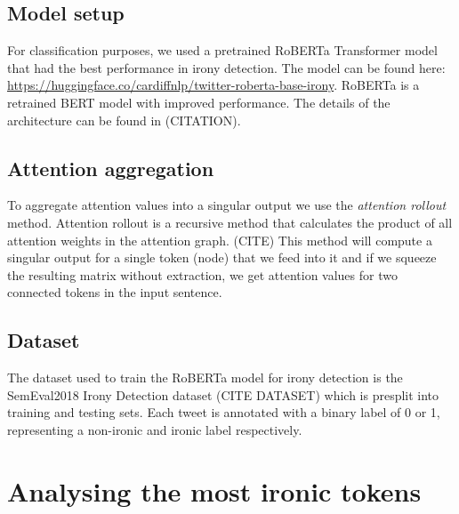 \documentclass[10pt, a4paper]{article}
\begin{document}
\subsection{Model setup}
\label{sec:first}

For classification purposes, we used a pretrained RoBERTa Transformer model that had the best performance in irony detection.
The model can be found here: \url{https://huggingface.co/cardiffnlp/twitter-roberta-base-irony}.
RoBERTa is a retrained BERT model with improved performance. The details of the architecture can be found in (CITATION). 

\subsection{Attention aggregation}
\label{sec:attaggr}

To aggregate attention values into a singular output we use the \textit{attention rollout} method.
Attention rollout is a recursive method that calculates the product of all attention weights in the attention graph. (CITE)
This method will compute a singular output for a single token (node) that we feed into it and if we squeeze the resulting matrix without extraction, we get attention values for two connected tokens in the input sentence.

\subsection{Dataset}

The dataset used to train the RoBERTa model for irony detection is the SemEval2018 Irony Detection dataset (CITE DATASET) which is presplit into training and testing sets.
Each tweet is annotated with a binary label of 0 or 1, representing a non-ironic and ironic label respectively.




\section{Analysing the most ironic tokens}
\end{document}
